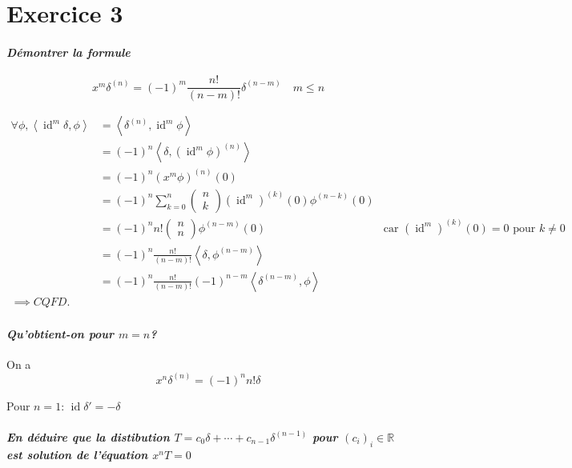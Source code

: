 \documentclass{article}
\newcommand{\R}{\mathbb{R}}
\newcommand{\id}{\operatorname{id}}
\begin{document}
\section{Exercice 3}

\paragraph{ \emph{Démontrer la formule} }

\[
	x^m \delta^{(n)} = (-1)^m \frac{n!}{(n-m)!} \delta^{(n-m)} \quad m \le n
\] 

\begin{align*}
	\forall \phi, \left<\id^m \delta, \phi \right> &= \left<\delta^{(n)}, \id^m \phi \right> \\
	&= (-1)^n \left< \delta, (\id^m \phi)^{(n)} \right> \\
	&= (-1)^n (x^m \phi)^{(n)}(0) \\
	&= (-1)^n \sum_{k=0}^{n} \begin{pmatrix} n \\k \end{pmatrix} (\id^m)^{(k)}(0) \phi^{(n-k)}(0) \\
	&= (-1)^n n! \begin{pmatrix} n \\n \end{pmatrix} \phi^{(n-m)}(0) \quad&\text{car $(\id^m)^{(k)}(0) = 0$ pour $k \neq  0$} \\
	&= (-1)^n \frac{n!}{(n-m)!} \left<\delta, \phi^{(n-m)} \right> \\
	&= (-1)^n \frac{n!}{(n-m)!} (-1)^{n-m} \left<\delta^{(n-m)}, \phi \right> \\
	\implies CQFD.
\end{align*}



\paragraph{\emph{Qu'obtient-on pour $m = n$?}}

On a 
\[
	x^n \delta^{(n)} = (-1)^n n! \delta 
\] 

\begin{remarque}
	Pour $n=1$:  $\id \delta' = -\delta$
\end{remarque}

\paragraph{ \emph{En déduire que la distibution $T = c_0 \delta + \cdots + c_{n-1} \delta^{(n-1)}$  pour $(c_i)_i \in \R$ est solution de l'équation $x^n T = 0$ }}
\end{document}
